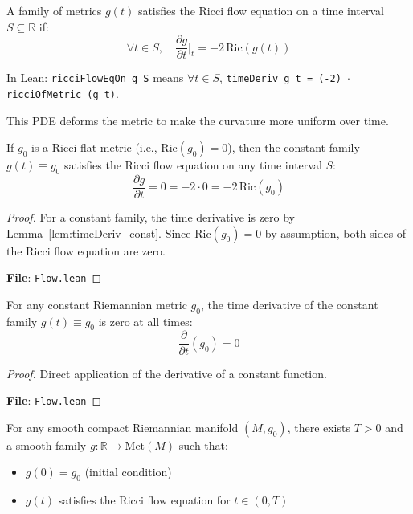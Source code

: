 \begin{definition}
\label{def:ricci_flow_eq_on}
\leanok
{}
A family of metrics $g(t)$ satisfies the Ricci flow equation on a time interval $S \subseteq \mathbb{R}$ if:
\[ \forall t \in S, \quad \frac{\partial g}{\partial t}\Big|_t = -2 \, \mathrm{Ric}(g(t)) \]

In Lean: \texttt{ricciFlowEqOn g S} means $\forall t \in S$, \texttt{timeDeriv g t = (-2) $\cdot$ ricciOfMetric (g t)}.

This PDE deforms the metric to make the curvature more uniform over time.
\end{definition}

\begin{lemma}
\label{lem:ricciFlowEqOn_const_of_ricciFlat}
\leanok
{}
If $g_0$ is a Ricci-flat metric (i.e., $\mathrm{Ric}(g_0) = 0$), then the constant family $g(t) \equiv g_0$ satisfies the Ricci flow equation on any time interval $S$:
\[ \frac{\partial g}{\partial t} = 0 = -2 \cdot 0 = -2 \, \mathrm{Ric}(g_0) \]
\end{lemma}

\begin{proof}
\leanok
For a constant family, the time derivative is zero by Lemma~\ref{lem:timeDeriv_const}. Since $\mathrm{Ric}(g_0) = 0$ by assumption, both sides of the Ricci flow equation are zero.

\textbf{File}: \texttt{Flow.lean}
\end{proof}

\begin{lemma}
\label{lem:timeDeriv_const}
\leanok
{}
For any constant Riemannian metric $g_0$, the time derivative of the constant family $g(t) \equiv g_0$ is zero at all times:
\[ \frac{\partial}{\partial t}(g_0) = 0 \]
\end{lemma}

\begin{proof}
\leanok
Direct application of the derivative of a constant function.

\textbf{File}: \texttt{Flow.lean}
\end{proof}

\begin{theorem}
\label{axiom:hamilton_ste}
For any smooth compact Riemannian manifold $(M, g_0)$, there exists $T > 0$ and a smooth family $g : \mathbb{R} \to \mathrm{Met}(M)$ such that:
\begin{itemize}
\item $g(0) = g_0$ (initial condition)
\item $g(t)$ satisfies the Ricci flow equation for $t \in (0, T)$
\end{itemize}
\end{theorem}

